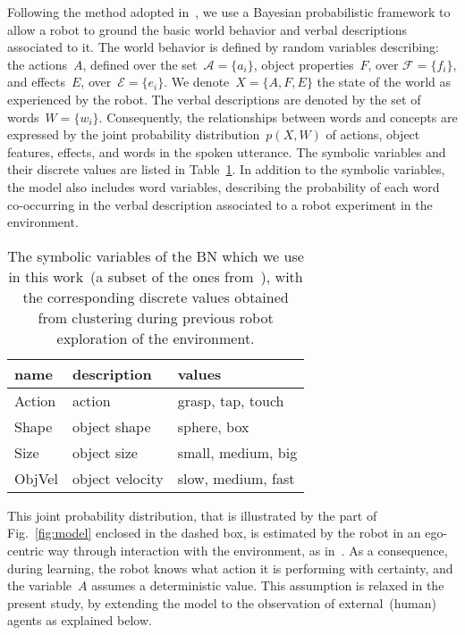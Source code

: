 Following the method adopted in~\cite{salvi:2012:smcb}, we use a Bayesian probabilistic framework to allow a robot to ground the basic world behavior and verbal descriptions associated to it. The world behavior is defined by random variables describing: the actions~$A$, defined over the set~$\mathcal{A} = \{a_i\}$, object properties~$F$, over $\mathcal{F} = \{f_i\}$, and effects~$E$, over~$\mathcal{E} = \{e_i\}$. We denote~$X = \{A, F, E\}$ the state of the world as experienced by the robot. The verbal descriptions are denoted by the set of words~$W = \{w_i\}$. Consequently, the relationships between words and concepts are expressed by the joint probability distribution~$p(X,W)$ of actions, object features, effects, and words in the spoken utterance. The symbolic variables and their discrete values are listed in Table~\ref{tab:bnsymb}. In addition to the symbolic variables, the model also includes word variables, describing the probability of each word co-occurring in the verbal description associated to a robot experiment in the environment.

\begin{table}
    \centering
    \caption{The symbolic variables of the \acl{BN} which we use in this work~(a subset of the ones from~\cite{salvi:2012:smcb}), with the corresponding discrete values obtained from clustering during previous robot exploration of the environment.}
    \label{tab:bnsymb}
    \begin{tabular}{*{3}{l}} %
    \toprule
    name   & description     & values \\
    \midrule
    Action & action          & grasp, tap, touch \\
    Shape  & object shape    & sphere, box \\
    Size   & object size     & small, medium, big \\
    ObjVel & object velocity & slow, medium, fast \\
    \bottomrule
    \end{tabular}
\end{table}

This joint probability distribution, that is illustrated by the part of Fig.~\ref{fig:model} enclosed in the dashed box, is estimated by the robot in an ego-centric way through interaction with the environment, as in~\cite{salvi:2012:smcb}. As a consequence, during learning, the robot knows what action it is performing with certainty, and the variable~$A$ assumes a deterministic value. This assumption is relaxed in the present study, by extending the model to the observation of external~(human) agents as explained below.

